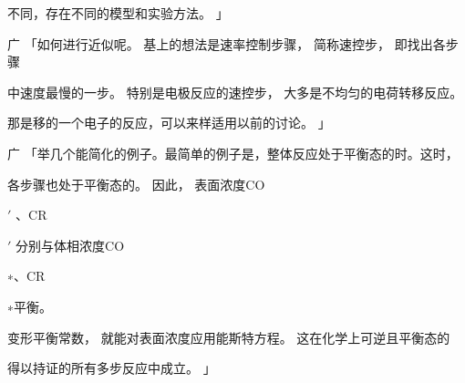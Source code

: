 不同，存在不同的模型和实验方法。 」\par
广 「如何进行近似呢。 基上的想法是速率控制步骤， 简称速控步， 即找出各步骤\par
中速度最慢的一步。 特别是电极反应的速控步， 大多是不均匀的电荷转移反应。\par
那是移的一个电子的反应，可以来样适用以前的讨论。 」\par
广 「举几个能简化的例子。最简单的例子是，整体反应处于平衡态的时。这时，\par
各步骤也处于平衡态的。 因此， 表面浓度CO\par
$\prime$ 、CR\par
$\prime$ 分别与体相浓度CO\par
∗、CR\par
∗平衡。\par
变形平衡常数， 就能对表面浓度应用能斯特方程。 这在化学上可逆且平衡态的\par
得以持证的所有多步反应中成立。 」\par

